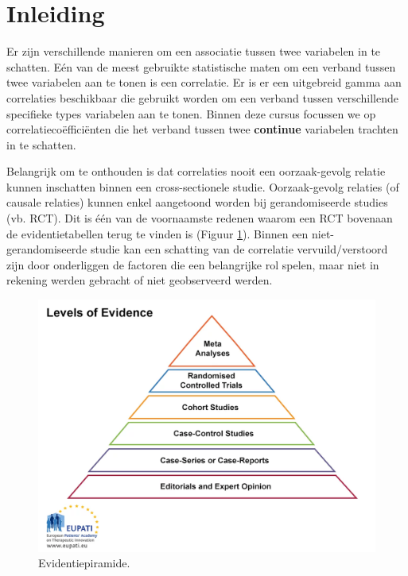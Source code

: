 \documentclass[
]{book}
\theoremstyle{definition}
\theoremstyle{definition}
\theoremstyle{definition}
\theoremstyle{definition}
\theoremstyle{remark}
\begin{document}
\hypertarget{inleiding}{%
\section*{Inleiding}\label{inleiding}}


Er zijn verschillende manieren om een associatie tussen twee variabelen in te schatten. Eén van de meest gebruikte statistische maten om een verband tussen twee variabelen aan te tonen is een correlatie. Er is er een uitgebreid gamma aan correlaties beschikbaar die gebruikt worden om een verband tussen verschillende specifieke types variabelen aan te tonen. Binnen deze cursus focussen we op correlatiecoëfficiënten die het verband tussen twee \textbf{continue} variabelen trachten in te schatten.

Belangrijk om te onthouden is dat correlaties nooit een oorzaak-gevolg relatie kunnen inschatten binnen een cross-sectionele studie. Oorzaak-gevolg relaties (of causale relaties) kunnen enkel aangetoond worden bij gerandomiseerde studies (vb. RCT). Dit is één van de voornaamste redenen waarom een RCT bovenaan de evidentietabellen terug te vinden is (Figuur \ref{fig:evidenceladder}). Binnen een niet-gerandomiseerde studie kan een schatting van de correlatie vervuild/verstoord zijn door onderliggen de factoren die een belangrijke rol spelen, maar niet in rekening werden gebracht of niet geobserveerd werden.

\begin{figure}
\includegraphics[width=1\linewidth]{img/evidenceladder} \caption{Evidentiepiramide.}\label{fig:evidenceladder}
\end{figure}
\end{document}
